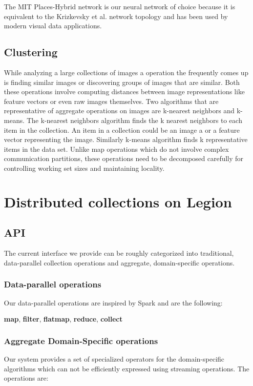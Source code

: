 \documentclass[tog]{acmsiggraph}
\begin{document}
The MIT Places-Hybrid network \cite{zhou2014learning} is our neural network of
choice because it is equivalent to the Krizkevsky et al. network topology
\cite{NIPS2012_4824} and has been used by modern visual data applications.

\subsection{Clustering}

While analyzing a large collections of images a operation the frequently comes
up is finding similar images or discovering groups of images that are similar.
Both these operations involve computing distances between image representations
like feature vectors or even raw images themselves. Two algorithms that are
representative of aggregate operations on images are k-nearest neighbors and
k-means. The k-nearest neighbors algorithm finds the k nearest neighbors to each
item in the collection. An item in a collection could be an image a or a feature
vector representing the image. Similarly k-means algorithm finds k
representative items in the data set. Unlike map operations which do not involve
complex communication partitions, these operations need to be decomposed
carefully for controlling working set sizes and maintaining locality.

\section{Distributed collections on Legion}

\subsection{API}

The current interface we provide can be roughly categorized into traditional,
data-parallel collection operations and aggregate, domain-specific
operations.

\subsubsection{Data-parallel operations}
Our data-parallel operations are inspired by Spark and are the
following:

\textbf{map}, \textbf{filter}, \textbf{flatmap}, \textbf{reduce},
\textbf{collect}

\subsubsection{Aggregate Domain-Specific operations}
Our system provides a set of specialized operators for the domain-specific
algorithms which can not be efficiently expressed using streaming
operations. The operations are:
\end{document}

